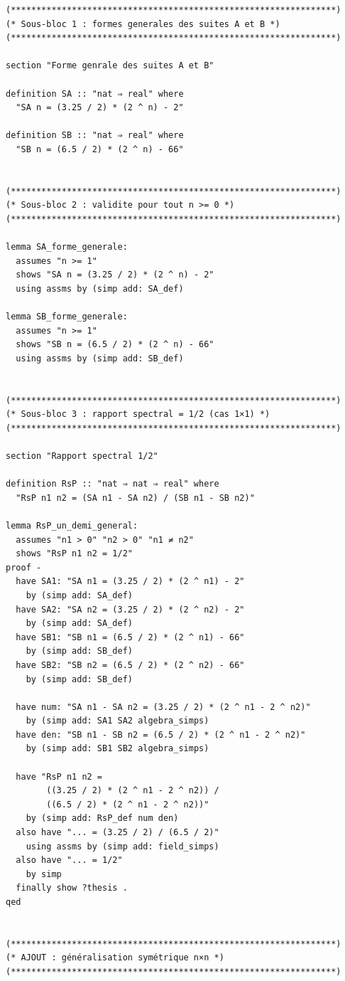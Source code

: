 \documentclass[a4paper,11pt]{article}
\begin{document}
\begin{holcode}[title={\textcolor{white}{Fichier : methode\_spectral.thy -- Partie 1/4}}]
\begin{lstlisting}
(****************************************************************)
(* Sous-bloc 1 : formes generales des suites A et B *)
(****************************************************************)

section "Forme genrale des suites A et B"

definition SA :: "nat ⇒ real" where
  "SA n = (3.25 / 2) * (2 ^ n) - 2"

definition SB :: "nat ⇒ real" where
  "SB n = (6.5 / 2) * (2 ^ n) - 66"


(****************************************************************)
(* Sous-bloc 2 : validite pour tout n >= 0 *)
(****************************************************************)

lemma SA_forme_generale:
  assumes "n >= 1"
  shows "SA n = (3.25 / 2) * (2 ^ n) - 2"
  using assms by (simp add: SA_def)

lemma SB_forme_generale:
  assumes "n >= 1"
  shows "SB n = (6.5 / 2) * (2 ^ n) - 66"
  using assms by (simp add: SB_def)


(****************************************************************)
(* Sous-bloc 3 : rapport spectral = 1/2 (cas 1×1) *)
(****************************************************************)

section "Rapport spectral 1/2"

definition RsP :: "nat ⇒ nat ⇒ real" where
  "RsP n1 n2 = (SA n1 - SA n2) / (SB n1 - SB n2)"

lemma RsP_un_demi_general:
  assumes "n1 > 0" "n2 > 0" "n1 ≠ n2"
  shows "RsP n1 n2 = 1/2"
proof -
  have SA1: "SA n1 = (3.25 / 2) * (2 ^ n1) - 2"
    by (simp add: SA_def)
  have SA2: "SA n2 = (3.25 / 2) * (2 ^ n2) - 2"
    by (simp add: SA_def)
  have SB1: "SB n1 = (6.5 / 2) * (2 ^ n1) - 66"
    by (simp add: SB_def)
  have SB2: "SB n2 = (6.5 / 2) * (2 ^ n2) - 66"
    by (simp add: SB_def)

  have num: "SA n1 - SA n2 = (3.25 / 2) * (2 ^ n1 - 2 ^ n2)"
    by (simp add: SA1 SA2 algebra_simps)
  have den: "SB n1 - SB n2 = (6.5 / 2) * (2 ^ n1 - 2 ^ n2)"
    by (simp add: SB1 SB2 algebra_simps)

  have "RsP n1 n2 =
        ((3.25 / 2) * (2 ^ n1 - 2 ^ n2)) /
        ((6.5 / 2) * (2 ^ n1 - 2 ^ n2))"
    by (simp add: RsP_def num den)
  also have "... = (3.25 / 2) / (6.5 / 2)"
    using assms by (simp add: field_simps)
  also have "... = 1/2"
    by simp
  finally show ?thesis .
qed


(****************************************************************)
(* AJOUT : généralisation symétrique n×n *)
(****************************************************************)


\end{lstlisting}
\end{holcode}
\end{document}
